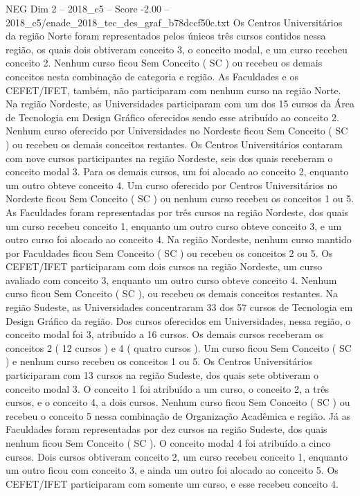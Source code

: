 \begin{textsample}{NEG Dim 2 – 2018\_c5 – Score -2.00 – 2018\_c5/enade\_2018\_tec\_des\_graf\_b78dccf50c.txt}
Os Centros Universitários da região Norte foram representados pelos únicos três cursos contidos nessa região, os quais dois obtiveram conceito 3, o conceito modal, e um curso recebeu conceito 2.
Nenhum curso ficou Sem Conceito ( SC ) ou recebeu os demais conceitos nesta combinação de categoria e região.
As Faculdades e os CEFET/IFET, também, não participaram com nenhum curso na região Norte.
Na região Nordeste, as Universidades participaram com um dos 15 cursos da Área de Tecnologia em Design Gráfico oferecidos sendo esse atribuído ao conceito 2.
Nenhum curso oferecido por Universidades no Nordeste ficou Sem Conceito ( SC ) ou recebeu os demais conceitos restantes.
Os Centros Universitários contaram com nove cursos participantes na região Nordeste, seis dos quais receberam o conceito modal 3.
Para os demais cursos, um foi alocado ao conceito 2, enquanto um outro obteve conceito 4.
Um curso oferecido por Centros Universitários no Nordeste ficou Sem Conceito ( SC ) ou nenhum curso recebeu os conceitos 1 ou 5.
As Faculdades foram representadas por três cursos na região Nordeste, dos quais um curso recebeu conceito 1, enquanto um outro curso obteve conceito 3, e um outro curso foi alocado ao conceito 4.
Na região Nordeste, nenhum curso mantido por Faculdades ficou Sem Conceito ( SC ) ou recebeu os conceitos 2 ou 5.
Os CEFET/IFET participaram com dois cursos na região Nordeste, um curso avaliado com conceito 3, enquanto um outro curso obteve conceito 4.
Nenhum curso ficou Sem Conceito ( SC ), ou recebeu os demais conceitos restantes.
Na região Sudeste, as Universidades concentraram 33 dos 57 cursos de Tecnologia em Design Gráfico da região.
Dos cursos oferecidos em Universidades, nessa região, o conceito modal foi 3, atribuído a 16 cursos.
Os demais cursos receberam os conceitos 2 ( 12 cursos ) e 4 ( quatro cursos ).
Um curso ficou Sem Conceito ( SC ) e nenhum curso recebeu os conceitos 1 ou 5.
Os Centros Universitários participaram com 13 cursos na região Sudeste, dos quais sete obtiveram o conceito modal 3.
O conceito 1 foi atribuído a um curso, o conceito 2, a três cursos, e o conceito 4, a dois cursos.
Nenhum curso ficou Sem Conceito ( SC ) ou recebeu o conceito 5 nessa combinação de Organização Acadêmica e região.
Já as Faculdades foram representadas por dez cursos na região Sudeste, dos quais nenhum ficou Sem Conceito ( SC ).
O conceito modal 4 foi atribuído a cinco cursos.
Dois cursos obtiveram conceito 2, um curso recebeu conceito 1, enquanto um outro ficou com conceito 3, e ainda um outro foi alocado ao conceito 5.
Os CEFET/IFET participaram com somente um curso, e esse recebeu conceito 4.

\end{textsample}
